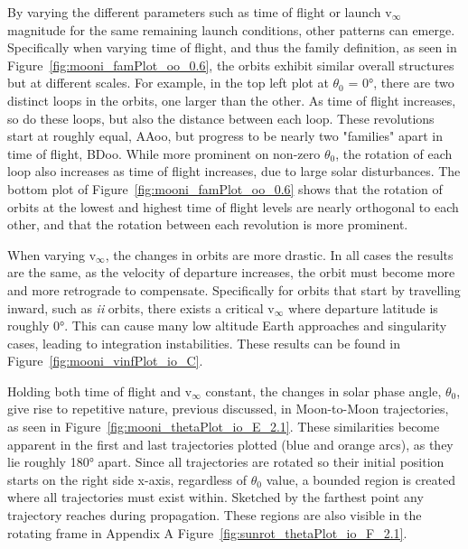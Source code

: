 \documentclass[letterpaper, paper,11pt]{AAS}	%
\begin{document}
By varying the different parameters such as time of flight or launch v\(_\infty\) magnitude for the same remaining launch conditions, other patterns can emerge. Specifically when varying time of flight, and thus the family definition, as seen in Figure~\ref{fig:mooni_famPlot_oo_0.6}, the orbits exhibit similar overall structures but at different scales. For example, in the top left plot at \(\theta_0\) = 0°, there are two distinct loops in the orbits, one larger than the other. As time of flight increases, so do these loops, but also the distance between each loop. These revolutions start at roughly equal, AAoo, but progress to be nearly two "families" apart in time of flight, BDoo. While more prominent on non-zero \(\theta_0\), the rotation of each loop also increases as time of flight increases, due to large solar disturbances. The bottom plot of Figure~\ref{fig:mooni_famPlot_oo_0.6} shows that the rotation of orbits at the lowest and highest time of flight levels are nearly orthogonal to each other, and that the rotation between each revolution is more prominent. 

When varying v\(_\infty\), the changes in orbits are more drastic. In all cases the results are the same, as the velocity of departure increases, the orbit must become more and more retrograde to compensate. Specifically for orbits that start by travelling inward, such as \emph{ii} orbits, there exists a critical v\(_\infty\) where departure latitude is roughly 0°. This can cause many low altitude Earth approaches and singularity cases, leading to integration instabilities. These results can be found in Figure~\ref{fig:mooni_vinfPlot_io_C}.

Holding both time of flight and v\(_\infty\) constant, the changes in solar phase angle, \(\theta_0\), give rise to repetitive nature, previous discussed, in Moon-to-Moon trajectories, as seen in Figure~\ref{fig:mooni_thetaPlot_io_E_2.1}. These similarities become apparent in the first and last trajectories plotted (blue and orange arcs), as they lie roughly 180° apart. Since all trajectories are rotated so their initial position starts on the right side x-axis, regardless of \(\theta_0\) value, a bounded region is created where all trajectories must exist within. Sketched by the farthest point any trajectory reaches during propagation. These regions are also visible in the rotating frame in Appendix A Figure~\ref{fig:sunrot_thetaPlot_io_F_2.1}. %
\end{document}
